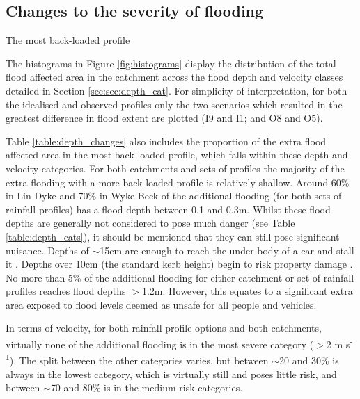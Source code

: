 \documentclass[APA,Times2COL]{WileyNJDv5}
\begin{document}
\subsection{Changes to the severity of flooding}\label{subsec:model}



The most back-loaded profile 



The histograms in Figure \ref{fig:histograms} display the distribution of the total flood affected area in the catchment across the flood depth and velocity classes detailed in Section \ref{sec:sec:depth_cat}. For simplicity of interpretation, for both the idealised and observed profiles only the two scenarios which resulted in the greatest difference in flood extent are plotted (I9 and I1; and O8 and O5). 

Table \ref{table:depth_changes} also includes the proportion of the extra flood affected area in the most back-loaded profile, which falls within these depth and velocity categories. For both catchments and sets of profiles the majority of the extra flooding with a more back-loaded profile is relatively shallow. Around 60\% in Lin Dyke and 70\% in Wyke Beck of the additional flooding (for both sets of rainfall profiles) has a flood depth between 0.1 and 0.3m. Whilst these flood depths are generally not considered to pose much danger (see Table \ref{table:depth_cats}), it should be mentioned that they can still pose significant nuisance. Depths of $\sim$15cm are enough to reach the under body of a car and stall it \citep{ pregnolato2017impact}.  Depths over 10cm (the standard kerb height) begin to risk property damage \citep{moftakhari2018nuisance}. No more than 5\% of the additional flooding for either catchment or set of rainfall profiles reaches flood depths $>$1.2m. However, this equates to a significant extra area exposed to flood levels deemed as unsafe for all people and vehicles. 

In terms of velocity, for both rainfall profile options and both catchments, virtually none of the additional flooding is in the most severe category ($>$2 m s\textsuperscript{-1}). The split between the other categories varies, but between $\sim$20 and 30\% is always in the lowest category, which is virtually still and poses little risk, and between $\sim$70 and 80\% is in the medium risk categories.  
\end{document}
